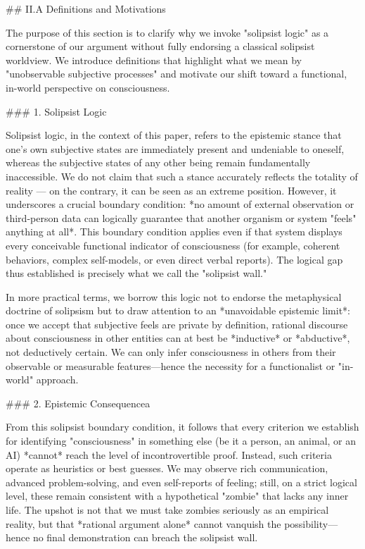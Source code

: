 ## II.A Definitions and Motivations

The purpose of this section is to clarify why we invoke "solipsist logic" as a cornerstone of our argument without fully endorsing a classical solipsist worldview. We introduce definitions that highlight what we mean by "unobservable subjective processes" and motivate our shift toward a functional, in-world perspective on consciousness.

### 1. Solipsist Logic

Solipsist logic, in the context of this paper, refers to the epistemic stance that one's own subjective states are immediately present and undeniable to oneself, whereas the subjective states of any other being remain fundamentally inaccessible. We do not claim that such a stance accurately reflects the totality of reality — on the contrary, it can be seen as an extreme position. However, it underscores a crucial boundary condition: *no amount of external observation or third-person data can logically guarantee that another organism or system "feels" anything at all*. This boundary condition applies even if that system displays every conceivable functional indicator of consciousness (for example, coherent behaviors, complex self-models, or even direct verbal reports). The logical gap thus established is precisely what we call the "solipsist wall."

In more practical terms, we borrow this logic not to endorse the metaphysical doctrine of solipsism but to draw attention to an *unavoidable epistemic limit*: once we accept that subjective feels are private by definition, rational discourse about consciousness in other entities can at best be *inductive* or *abductive*, not deductively certain. We can only infer consciousness in others from their observable or measurable features—hence the necessity for a functionalist or "in-world" approach.

### 2. Epistemic Consequencea

From this solipsist boundary condition, it follows that every criterion we establish for identifying "consciousness" in something else (be it a person, an animal, or an AI) *cannot* reach the level of incontrovertible proof. Instead, such criteria operate as heuristics or best guesses. We may observe rich communication, advanced problem-solving, and even self-reports of feeling; still, on a strict logical level, these remain consistent with a hypothetical "zombie" that lacks any inner life. The upshot is not that we must take zombies seriously as an empirical reality, but that *rational argument alone* cannot vanquish the possibility—hence no final demonstration can breach the solipsist wall.

